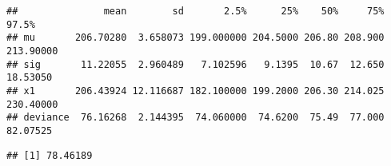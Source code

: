 \documentclass[]{article}
\newenvironment{Shaded}{\begin{snugshade}}{\end{snugshade}}
\newcommand{\KeywordTok}[1]{\textcolor[rgb]{0.13,0.29,0.53}{\textbf{{#1}}}}
\newcommand{\CommentTok}[1]{\textcolor[rgb]{0.56,0.35,0.01}{\textit{{#1}}}}
\newcommand{\NormalTok}[1]{{#1}}
\begin{document}
\begin{Shaded}
\end{Shaded}

\begin{verbatim}
##               mean        sd       2.5%      25%    50%     75%     97.5%
## mu       206.70280  3.658073 199.000000 204.5000 206.80 208.900 213.90000
## sig       11.22055  2.960489   7.102596   9.1395  10.67  12.650  18.53050
## x1       206.43924 12.116687 182.100000 199.2000 206.30 214.025 230.40000
## deviance  76.16268  2.144395  74.060000  74.6200  75.49  77.000  82.07525
\end{verbatim}

\begin{Shaded}
\end{Shaded}

\begin{verbatim}
## [1] 78.46189
\end{verbatim}
\end{document}

